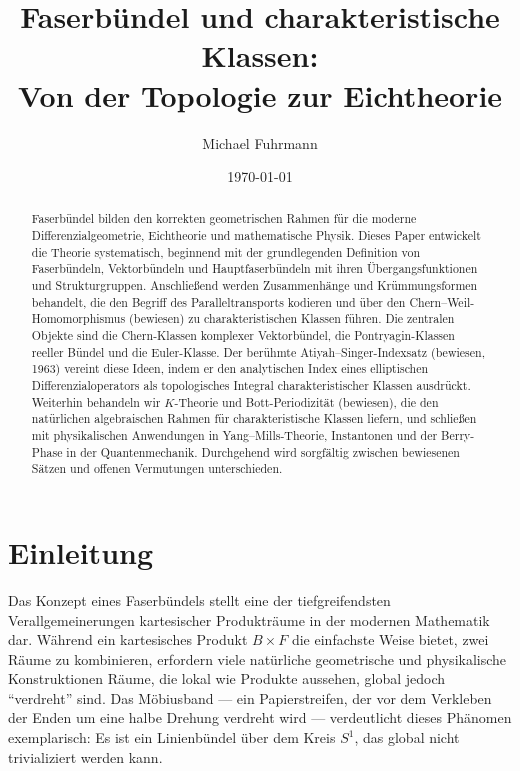 \documentclass[12pt,a4paper]{amsart}
\author{Michael Fuhrmann}
\date{\today}
\theoremstyle{definition}
\begin{document}
\title{Faserbündel und charakteristische Klassen:\\
Von der Topologie zur Eichtheorie}

\begin{abstract}
Faserbündel bilden den korrekten geometrischen Rahmen für die moderne Differenzialgeometrie,
Eichtheorie und mathematische Physik. Dieses Paper entwickelt die Theorie systematisch,
beginnend mit der grundlegenden Definition von Faserbündeln, Vektorbündeln und
Hauptfaserbündeln mit ihren Übergangsfunktionen und Strukturgruppen. Anschließend
werden Zusammenhänge und Krümmungsformen behandelt, die den Begriff des Paralleltransports
kodieren und über den Chern--Weil-Homomorphismus (bewiesen) zu charakteristischen Klassen
führen. Die zentralen Objekte sind die Chern-Klassen komplexer Vektorbündel, die
Pontryagin-Klassen reeller Bündel und die Euler-Klasse. Der berühmte
Atiyah--Singer-Indexsatz (bewiesen, 1963) vereint diese Ideen, indem er den analytischen
Index eines elliptischen Differenzialoperators als topologisches Integral charakteristischer
Klassen ausdrückt. Weiterhin behandeln wir $K$-Theorie und Bott-Periodizität (bewiesen),
die den natürlichen algebraischen Rahmen für charakteristische Klassen liefern, und
schließen mit physikalischen Anwendungen in Yang--Mills-Theorie, Instantonen und der
Berry-Phase in der Quantenmechanik. Durchgehend wird sorgfältig zwischen bewiesenen
Sätzen und offenen Vermutungen unterschieden.
\end{abstract}

\maketitle

\tableofcontents

\section{Einleitung}

Das Konzept eines Faserbündels stellt eine der tiefgreifendsten Verallgemeinerungen
kartesischer Produkträume in der modernen Mathematik dar. Während ein kartesisches
Produkt $B \times F$ die einfachste Weise bietet, zwei Räume zu kombinieren, erfordern
viele natürliche geometrische und physikalische Konstruktionen Räume, die lokal wie
Produkte aussehen, global jedoch ``verdreht'' sind. Das Möbiusband --- ein
Papierstreifen, der vor dem Verkleben der Enden um eine halbe Drehung verdreht wird
--- verdeutlicht dieses Phänomen exemplarisch: Es ist ein Linienbündel über dem Kreis
$S^1$, das global nicht trivializiert werden kann.
\end{document}
